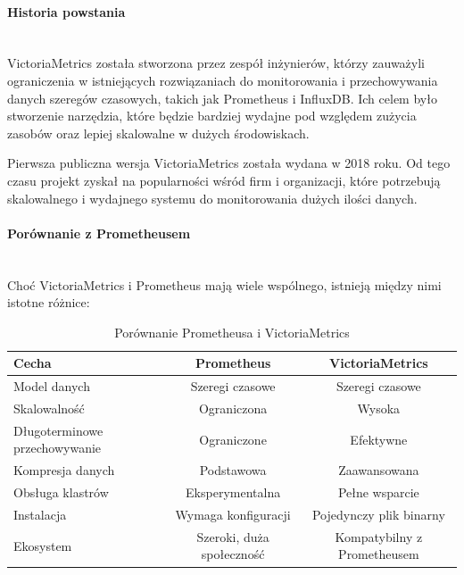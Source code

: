 \documentclass{article}
\begin{document}
\paragraph{Historia powstania}\mbox{} \\


VictoriaMetrics została stworzona przez zespół inżynierów, którzy zauważyli ograniczenia w istniejących rozwiązaniach do monitorowania i przechowywania danych szeregów czasowych, takich jak Prometheus i InfluxDB. Ich celem było stworzenie narzędzia, które będzie bardziej wydajne pod względem zużycia zasobów oraz lepiej skalowalne w dużych środowiskach.

Pierwsza publiczna wersja VictoriaMetrics została wydana w 2018 roku. Od tego czasu projekt zyskał na popularności wśród firm i organizacji, które potrzebują skalowalnego i wydajnego systemu do monitorowania dużych ilości danych.

\paragraph{Porównanie z Prometheusem}\mbox{} \\


Choć VictoriaMetrics i Prometheus mają wiele wspólnego, istnieją między nimi istotne różnice:

\begin{table}[H]
    \centering
    \begin{tabular}{|l|c|c|}
        \hline
        \textbf{Cecha} & \textbf{Prometheus} & \textbf{VictoriaMetrics} \\ \hline
        Model danych & Szeregi czasowe & Szeregi czasowe \\ \hline
        Skalowalność & Ograniczona & Wysoka \\ \hline
        Długoterminowe przechowywanie & Ograniczone & Efektywne \\ \hline
        Kompresja danych & Podstawowa & Zaawansowana \\ \hline
        Obsługa klastrów & Eksperymentalna & Pełne wsparcie \\ \hline
        Instalacja & Wymaga konfiguracji & Pojedynczy plik binarny \\ \hline
        Ekosystem & Szeroki, duża społeczność & Kompatybilny z Prometheusem \\ \hline
    \end{tabular}
    \caption{Porównanie Prometheusa i VictoriaMetrics}
    \label{tab:porownanie-prometheus-victoriametrics}
\end{table}
\end{document}
